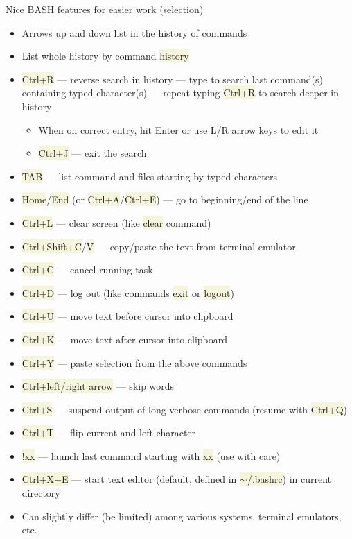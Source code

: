 \documentclass[compress, xelatex, 11pt, xcolor=svgnames, aspectratio=169, url={hyphens, lowtilde}]{beamer}
\renewcommand{\texttt}[1]{\colorbox{Beige}{{\ttfamily #1}}}
\begin{document}
\begin{frame}[allowframebreaks]{Nice BASH features for easier work (selection)}
	\begin{itemize}
		\item Arrows up and down list in the history of commands
		\item List whole history by command \texttt{history}
		\item \texttt{Ctrl+R} --- reverse search in history --- type to search last command(s) containing typed character(s) --- repeat typing \texttt{Ctrl+R} to search deeper in history
		\begin{itemize}
			\item When on correct entry, hit Enter or use L/R arrow keys to edit it
			\item \texttt{Ctrl+J} --- exit the search
		\end{itemize}
		\item \texttt{TAB} --- list command and files starting by typed characters
		\item \texttt{Home}/\texttt{End} (or \texttt{Ctrl+A}/\texttt{Ctrl+E}) --- go to beginning/end of the line
		\item \texttt{Ctrl+L} --- clear screen (like \texttt{clear} command)
		\item \texttt{Ctrl+Shift+C}/\texttt{V} --- copy/paste the text from terminal emulator
		\item \texttt{Ctrl+C} --- cancel running task
		\item \texttt{Ctrl+D} --- log out (like commands \texttt{exit} or \texttt{logout})
		\item \texttt{Ctrl+U} --- move text before cursor into clipboard
		\item \texttt{Ctrl+K} --- move text after cursor into clipboard
		\item \texttt{Ctrl+Y} --- paste selection from the above commands
		\item \texttt{Ctrl+left/right arrow} --- skip words
		\item \texttt{Ctrl+S} --- suspend output of long verbose commands (resume with \texttt{Ctrl+Q})
		\item \texttt{Ctrl+T} --- flip current and left character
		\item \texttt{!xx} --- launch last command starting with \texttt{xx} (use with care)
		\item \texttt{Ctrl+X+E} --- start text editor (default, defined in \texttt{$\sim$/.bashrc}) in current directory
		\item Can slightly differ (be limited) among various systems, terminal emulators, etc.
	\end{itemize}
\end{frame}
\end{document}
